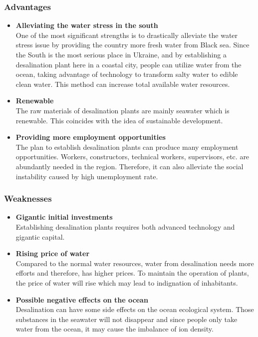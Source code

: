 \subsubsection{Advantages}
\begin{itemize}
\item \textbf{Alleviating the water stress in the south}\\
One of the most significant strengths is to drastically alleviate the water stress issue by providing the country more fresh water from Black sea. Since the South is the most serious place in Ukraine, and by establishing a desalination plant here in a coastal city, people can utilize water from the ocean, taking advantage of technology to transform salty water to edible clean water. This method can increase total available water resources.
\item \textbf{Renewable}\\
The raw materials of desalination plants are mainly seawater which is renewable. This coincides with the idea of sustainable development.
\item \textbf{Providing more employment opportunities}\\
The plan to establish desalination plants can produce many employment opportunities. Workers, constructors, technical workers, supervisors, etc. are abundantly needed in the region. Therefore, it can also alleviate the social instability caused by high unemployment rate.
\end{itemize}

\subsubsection{Weaknesses}
\begin{itemize}
\item \textbf{Gigantic initial investments}\\
Establishing desalination plants requires both advanced technology and gigantic capital.
\item \textbf{Rising price of water}\\
Compared to the normal water resources, water from desalination needs more efforts and therefore, has higher prices. To maintain the operation of plants, the price of water will rise which may lead to indignation of inhabitants.
\item \textbf{Possible negative effects on the ocean}\\
Desalination can have some side effects on the ocean ecological system. Those substances in the seawater will not disappear and since people only take water from the ocean, it may cause the imbalance of ion density.
\end{itemize}

